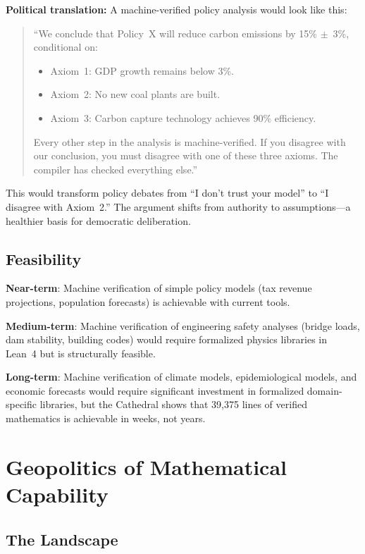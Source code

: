 \documentclass[11pt,a4paper]{article}
\begin{document}
\textbf{Political translation:} A machine-verified policy analysis
would look like this:

\begin{quote}
``We conclude that Policy~X will reduce carbon emissions by 15\%
$\pm$~3\%, conditional on:
\begin{itemize}
  \item Axiom~1: GDP growth remains below 3\%.
  \item Axiom~2: No new coal plants are built.
  \item Axiom~3: Carbon capture technology achieves 90\% efficiency.
\end{itemize}
Every other step in the analysis is machine-verified. If you
disagree with our conclusion, you must disagree with one of these
three axioms. The compiler has checked everything else.''
\end{quote}

This would transform policy debates from ``I don't trust your model''
to ``I disagree with Axiom~2.'' The argument shifts from authority
to assumptions---a healthier basis for democratic deliberation.

\subsection{Feasibility}

\textbf{Near-term}: Machine verification of simple policy models
(tax revenue projections, population forecasts) is achievable with
current tools.

\textbf{Medium-term}: Machine verification of engineering safety
analyses (bridge loads, dam stability, building codes) would require
formalized physics libraries in Lean~4 but is structurally feasible.

\textbf{Long-term}: Machine verification of climate models,
epidemiological models, and economic forecasts would require
significant investment in formalized domain-specific libraries, but
the Cathedral shows that 39,375 lines of verified mathematics
is achievable in weeks, not years.

\section{Geopolitics of Mathematical Capability}
\label{sec:geopolitics}

\subsection{The Landscape}
\end{document}
